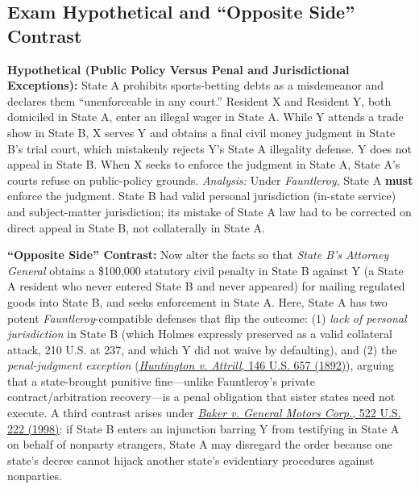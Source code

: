 \documentclass[12pt]{article}
\begin{document}
\subsection{Exam Hypothetical and ``Opposite Side'' Contrast}
\textbf{Hypothetical (Public Policy Versus Penal and Jurisdictional Exceptions):} State A prohibits sports-betting debts as a misdemeanor and declares them ``unenforceable in any court.'' Resident X and Resident Y, both domiciled in State A, enter an illegal wager in State A. While Y attends a trade show in State B, X serves Y and obtains a final civil money judgment in State B's trial court, which mistakenly rejects Y's State A illegality defense. Y does not appeal in State B. When X seeks to enforce the judgment in State A, State A's courts refuse on public-policy grounds. \textit{Analysis:} Under \textit{Fauntleroy}, State A \textbf{must} enforce the judgment. State B had valid personal jurisdiction (in-state service) and subject-matter jurisdiction; its mistake of State A law had to be corrected on direct appeal in State B, not collaterally in State A.

\textbf{``Opposite Side'' Contrast:} Now alter the facts so that \textit{State B's Attorney General} obtains a \$100,000 statutory civil penalty in State B against Y (a State A resident who never entered State B and never appeared) for mailing regulated goods into State B, and seeks enforcement in State A. Here, State A has two potent \textit{Fauntleroy}-compatible defenses that flip the outcome: (1) \textit{lack of personal jurisdiction} in State B (which Holmes expressly preserved as a valid collateral attack, 210 U.S. at 237, and which Y did not waive by defaulting), and (2) the \textit{penal-judgment exception} (\href{https://supreme.justia.com/cases/federal/us/146/657/}{\textit{Huntington v. Attrill}, 146 U.S. 657 (1892)}), arguing that a state-brought punitive fine---unlike Fauntleroy's private contract/arbitration recovery---is a penal obligation that sister states need not execute. A third contrast arises under \href{https://supreme.justia.com/cases/federal/us/522/222/}{\textit{Baker v. General Motors Corp.}, 522 U.S. 222 (1998)}: if State B enters an injunction barring Y from testifying in State A on behalf of nonparty strangers, State A may disregard the order because one state's decree cannot hijack another state's evidentiary procedures against nonparties.
\end{document}
